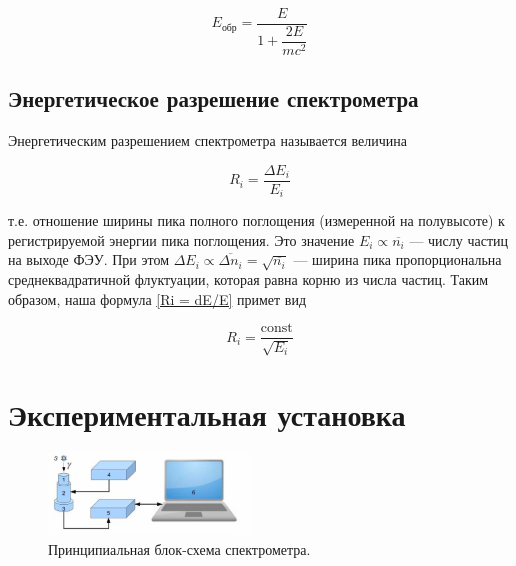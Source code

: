 \documentclass{article}
\begin{document}
	\begin{equation}\label{Eobr}
		E_{обр} = \dfrac{E}{1 + \dfrac{2E}{mc^2}}
	\end{equation}

\subsection*{Энергетическое разрешение спектрометра }
%	
	Энергетическим разрешением спектрометра называется величина
	
	\begin{equation}\label{Ri = dE/E}
	R_i = \dfrac{\Delta E_i}{E_i}
	\end{equation}
	
	т.е. отношение ширины пика полного поглощения (измеренной на полувысоте) к регистрируемой энергии пика поглощения. Это значение $ E_i \propto \overline{n_i} $ --- числу частиц на выходе ФЭУ. При этом  $ \Delta E_i \propto \overline{\Delta n_i} = \sqrt{\overline{n_i}} $ --- ширина пика пропорциональна среднеквадратичной флуктуации, которая равна корню из числа частиц. Таким образом, наша формула \eqref{Ri = dE/E} примет вид
	
	\begin{equation}\label{Ri = c/E}
	R_i = \dfrac{\mathrm{const}}{\sqrt{E_i}}
	\end{equation}

\newpage


\section{Экспериментальная установка}

\begin{figure}
  \centering
  \includegraphics[width=0.48\textwidth]{Screenshot 2023-12-03 at 7.42.11 PM.png}
    
    \caption{Принципиальная блок-схема спектрометра. }
\label{schem}
  
  
\end{figure}
\end{document}

